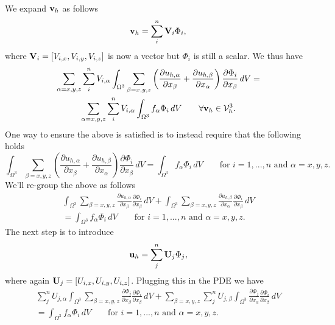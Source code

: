 \documentclass[oneside,a4paper,11pt]{report}
\begin{document}
We expand $\mathbf{v}_h$ as follows
\begin{equation}
    \mathbf{v}_h = \sum_i^n \mathbf{V}_i \Phi_i,
\end{equation}
where $\mathbf{V}_i=[V_{i,x}, V_{i,y}, V_{i,z}]$ is now a vector but $\Phi_i$ is still a scalar. We thus have
\begin{multline}
    \sum_{\alpha=x,y,z} \sum_i^n V_{i,\alpha} \int_{\Omega^3} \sum_{\beta=x,y,z} \left ( \frac{\partial u_{h,\alpha}}{\partial x_\beta} + \frac{\partial u_{h,\beta}}{\partial x_\alpha} \right ) \frac{\partial \Phi_i}{\partial x_\beta} \, dV = \\
    \sum_{\alpha=x,y,z} \sum_i^n V_{i,\alpha} \int_{\Omega^3} f_\alpha \Phi_i \,dV \qquad \forall \mathbf{v}_h \in \mathcal{V}_h^3.
\end{multline}
One way to ensure the above is satisfied is to instead require that the following holds
\begin{equation}
    \int_{\Omega^3} \sum_{\beta=x,y,z} \left ( \frac{\partial u_{h,\alpha}}{\partial x_\beta} + \frac{\partial u_{h,\beta}}{\partial x_\alpha} \right ) \frac{\partial \Phi_i}{\partial x_\beta} \, dV = \int_{\Omega^3} f_\alpha \Phi_i \,dV \qquad \text{for } i = 1,...,n \text{ and } \alpha = x,y,z.
\end{equation}
We'll re-group the above as follows
\begin{multline}
    \int_{\Omega^3} \sum_{\beta=x,y,z} \frac{\partial u_{h,\alpha}}{\partial x_\beta} \frac{\partial \Phi_i}{\partial x_\beta} \,dV + \int_{\Omega^3} \sum_{\beta=x,y,z} \frac{\partial u_{h,\beta}}{\partial x_\alpha} \frac{\partial \Phi_i}{\partial x_\beta} \, dV \\
    = \int_{\Omega^3} f_\alpha \Phi_i \,dV \qquad \text{for } i = 1,...,n \text{ and } \alpha = x,y,z.
\end{multline}
The next step is to introduce 
\begin{equation}
    \mathbf{u}_h = \sum_j^n \mathbf{U}_j \Phi_j,
\end{equation}
where again $\mathbf{U}_j = [U_{i,x}, U_{i,y}, U_{i,z}]$. Plugging this in the PDE we have
\begin{multline}
    \sum_j^n U_{j,\alpha} \int_{\Omega^3} \sum_{\beta=x,y,z} \frac{\partial \Phi_j}{\partial x_\beta} \frac{\partial \Phi_i}{\partial x_\beta} \,dV + \sum_{\beta=x,y,z} \sum_j^n U_{j,\beta} \int_{\Omega^3} \frac{\partial \Phi_j}{\partial x_\alpha} \frac{\partial \Phi_i}{\partial x_\beta} \, dV \\
    = \int_{\Omega^3} f_\alpha \Phi_i \,dV \qquad \text{for } i = 1,...,n \text{ and } \alpha = x,y,z.
\end{multline}
\end{document}
